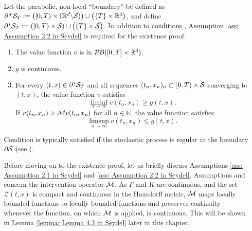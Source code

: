 Let the parabolic, non-local ``boundary'' be defined as $\partial^+ \mathcal{S}_T:= \big( [0,T) \times (\mathbb{R}^d \backslash \mathcal{S}) \big) \cup \big( \{T\} \times \mathbb{R}^d \big)$, and define $\partial^* \mathcal{S}_T := ([0,T) \times \mathcal{S}) \cup \big( \{T\}\times \Bar{\mathcal{S}} \big)$. In addition to conditions , Assumption \ref{ass: Assumption 2.2 in Seydel} is required for the existence proof.
\begin{assumption}
    \label{ass: Assumption 2.2 in Seydel}
    \begin{enumerate}[label=(\textup{E}\arabic*), ref=(\textup{E}\arabic*)]
        \item \label{ass: E1} The value function $v$ is in $\mathcal{PB}([0,T] \times \mathbb{R}^d)$.
        \item \label{ass: E2} $g$ is continuous.
        \item \label{ass: E3} For every $(t,x) \in \partial^* \mathcal{S}_T$ and all sequences $(t_n,x_n)_n \subset [0,T) \times \mathcal{S}$ converging to $(t,x)$, the value function $v$ satisfies
        \begin{equation*}
            \liminf_{n \rightarrow \infty} v(t_n,x_n) \geq g(t,x).
        \end{equation*}
        If $v(t_n,x_n) > \mathcal{M} v(t_n,x_n)$ for all $n \in \mathbb N$, the value function satisfies
        \begin{equation*}
            \limsup_{n\rightarrow \infty} v(t_n,x_n) \leq g(t,x).
        \end{equation*}
    \end{enumerate}
\end{assumption}
\begin{remark}
    Condition  is typically satisfied if the stochastic process is regular at the boundary $\partial \mathcal{S}$ (see \cite[Section 4.1]{seydel2010generalexistenceuniquenessviscosity}). 
\end{remark}

Before moving on to the existence proof, let us briefly discuss  Assumptions \ref{ass: Assumption 2.1 in Seydel} and \ref{ass: Assumption 2.2 in Seydel}. Assumptions  and  concern the intervention operator $\mathcal{M}$. As $\Gamma$  and $K$ are continuous, and the set $\mathcal{Z}(t,x)$ is compact and continuous in the Hausdorff metric, $\mathcal{M}$ maps locally bounded functions to locally bounded functions and preserves continuity whenever the function, on which $\mathcal{M}$ is applied, is continuous. This will be shown in Lemma \ref{lemma: Lemma 4.3 in Seydel} later in this chapter. 

